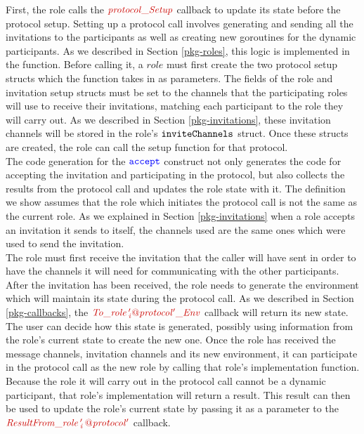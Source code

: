 \documentclass[12pt,twoside]{report}
\begin{document}
First, the role calls the $\functionname{protocol\_Setup}$ callback to update its state before the protocol setup. Setting up a protocol call involves generating and sending all the invitations to the participants as well as creating new goroutines for the dynamic participants. As we described in Section \ref{pkg-roles}, this logic is implemented in the {\color{dkred}\textit{}} function. Before calling it, a $\mathit{role}$ must first create the two protocol setup structs which the function takes in as parameters. The fields of the role and invitation setup structs must be set to the channels that the participating roles will use to receive their invitations, matching each participant to the role they will carry out. As we described in Section \ref{pkg-invitations}, these invitation channels will be stored in the role's ${\mathtt{inviteChannels}}$ struct. Once these structs are created, the role can call the setup function for that protocol.\\

The code generation for the ${\color{blue}\mathtt{accept}}$ construct not only generates the code for accepting the invitation and participating in the protocol, but also collects the results from the protocol call and updates the role state with it. The definition we show assumes that the role which initiates the protocol call is not the same as the current role. As we explained in Section \ref{pkg-invitations} when a role accepts an invitation it sends to itself, the channels used are the same ones which were used to send the invitation.\\

The role must first receive the invitation that the caller will have sent in order to have the channels it will need for communicating with the other participants. After the invitation has been received, the role needs to generate the environment which will maintain its state during the protocol call. As we described in Section \ref{pkg-callbacks}, the $\functionname{To\_role\,'_i@protocol'\_Env}$ callback will return its new state. The user can decide how this state is generated, possibly using information from the role's current state to create the new one. Once the role has received the message channels, invitation channels and its new environment, it can participate in the protocol call as the new role by calling that role's implementation function. Because the role it will carry out in the protocol call cannot be a dynamic participant, that role's implementation will return a result. This result can then be used to update the role's current state by passing it as a parameter to the $\functionname{ResultFrom\_role\,'_i\,@protocol'}$ callback.
\end{document}
